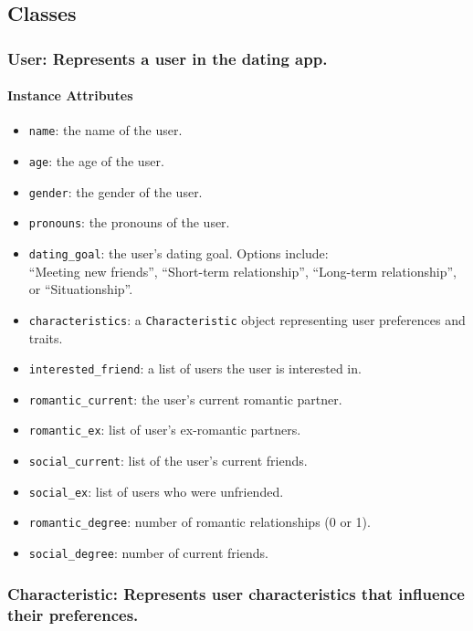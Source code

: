 \documentclass[fontsize=11pt]{article}
\begin{document}
\subsection*{Classes}

\subsubsection*{User: Represents a user in the dating app.}

\paragraph{Instance Attributes}
\begin{itemize}
    \item \texttt{name}: the name of the user.
    \item \texttt{age}: the age of the user.
    \item \texttt{gender}: the gender of the user.
    \item \texttt{pronouns}: the pronouns of the user.
    \item \texttt{dating\_goal}: the user's dating goal. Options include: \\
    ``Meeting new friends'', ``Short-term relationship'', ``Long-term relationship'', or ``Situationship''.
    \item \texttt{characteristics}: a \texttt{Characteristic} object representing user preferences and traits.
    \item \texttt{interested\_friend}: a list of users the user is interested in.
    \item \texttt{romantic\_current}: the user's current romantic partner.
    \item \texttt{romantic\_ex}: list of user's ex-romantic partners.
    \item \texttt{social\_current}: list of the user's current friends.
    \item \texttt{social\_ex}: list of users who were unfriended.
    \item \texttt{romantic\_degree}: number of romantic relationships (0 or 1).
    \item \texttt{social\_degree}: number of current friends.
\end{itemize}

\subsubsection*{Characteristic: Represents user characteristics that influence their preferences.}
\end{document}
